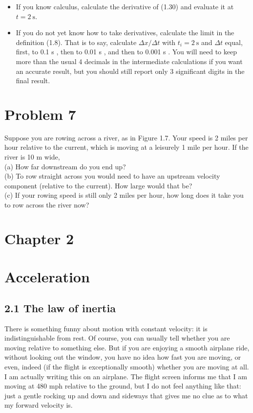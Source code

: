 \documentclass[10pt]{article}
\begin{document}
\begin{itemize}
  \item If you know calculus, calculate the derivative of (1.30) and evaluate it at $t=2 \mathrm{~s}$.
  \item If you do not yet know how to take derivatives, calculate the limit in the definition (1.8). That is to say, calculate $\Delta x / \Delta t$ with $t_{i}=2 \mathrm{~s}$ and $\Delta t$ equal, first, to 0.1 s , then to 0.01 s , and then to 0.001 s . You will need to keep more than the usual 4 decimals in the intermediate calculations if you want an accurate result, but you should still report only 3 significant digits in the final result.
\end{itemize}

\section*{Problem 7}
Suppose you are rowing across a river, as in Figure 1.7. Your speed is 2 miles per hour relative to the current, which is moving at a leisurely 1 mile per hour. If the river is 10 m wide,\\
(a) How far downstream do you end up?\\
(b) To row straight across you would need to have an upstream velocity component (relative to the current). How large would that be?\\
(c) If your rowing speed is still only 2 miles per hour, how long does it take you to row across the river now?

\section*{Chapter 2}
\section*{Acceleration}
\subsection*{2.1 The law of inertia}
There is something funny about motion with constant velocity: it is indistinguishable from rest. Of course, you can usually tell whether you are moving relative to something else. But if you are enjoying a smooth airplane ride, without looking out the window, you have no idea how fast you are moving, or even, indeed (if the flight is exceptionally smooth) whether you are moving at all. I am actually writing this on an airplane. The flight screen informs me that I am moving at 480 mph relative to the ground, but I do not feel anything like that: just a gentle rocking up and down and sideways that gives me no clue as to what my forward velocity is.
\end{document}
